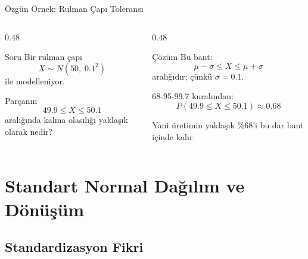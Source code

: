 \documentclass[light]{lutbeamer}
\begin{document}
\begin{frame}{Özgün Örnek: Rulman Çapı Toleransı}
\small
\begin{columns}[T,onlytextwidth]
    \begin{column}{0.48\textwidth}
        \begin{block}{Soru}
            Bir rulman çapı
            \[
            X \sim N(50,\;0.1^2)
            \]
            ile modelleniyor.

            \vspace{0.15cm}
            Parçanın
            \[
            49.9 \le X \le 50.1
            \]
            aralığında kalma olasılığı yaklaşık olarak nedir?
        \end{block}
    \end{column}
    \begin{column}{0.48\textwidth}
        \begin{exampleblock}{Çözüm}
            Bu bant:
            \[
            \mu-\sigma \le X \le \mu+\sigma
            \]
            aralığıdır; çünkü $\sigma=0.1$.

            \vspace{0.15cm}
            68-95-99.7 kuralından:
            \[
            P(49.9 \le X \le 50.1)\approx 0.68
            \]

            Yani üretimin yaklaşık \%68'i bu dar bant içinde kalır.
        \end{exampleblock}
    \end{column}
\end{columns}
\end{frame}

\section{Standart Normal Dağılım ve Dönüşüm}
\subsection{Standardizasyon Fikri}
\end{document}
